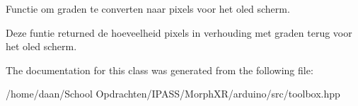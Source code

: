 Functie om graden te converten naar pixels voor het oled scherm. 

Deze funtie returned de hoeveelheid pixels in verhouding met graden terug voor het oled scherm. 

The documentation for this class was generated from the following file\+:\begin{DoxyCompactItemize}
\item 
/home/daan/\+School Opdrachten/\+I\+P\+A\+S\+S/\+Morph\+X\+R/arduino/src/toolbox.\+hpp\end{DoxyCompactItemize}
